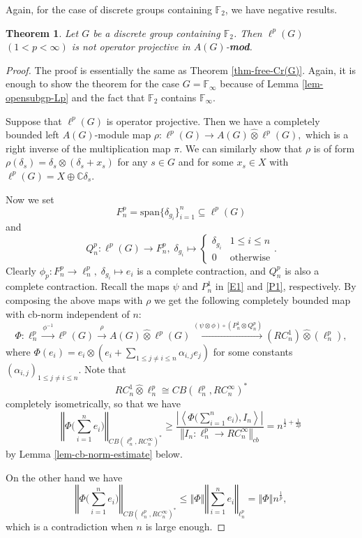 \documentclass[10pt]{amsart}
\newtheorem{thm}{Theorem}
\numberwithin{thm}{section}
\numberwithin{equation}{section}
\begin{document}
Again, for the case of discrete groups containing $\mathbb{F}_2$, we have negative results.
	\begin{thm}\label{thm-free-comLp}
	Let $G$ be a discrete group containing $\mathbb{F}_2$.
	Then $\ell^p(G)$ $(1<p < \infty)$ is not operator projective in $A(G)$-{\bf mod}.
	\end{thm}
\begin{proof}
The proof is essentially the same as Theorem \ref{thm-free-Cr(G)}.
Again, it is enough to show the theorem for the case $G = \mathbb{F}_\infty$
because of Lemma \ref{lem-opensubgp-Lp} and the fact that $\mathbb{F}_2$ contains $\mathbb{F}_\infty$.

Suppose that $\ell^p(G)$ is operator projective. Then we have a completely bounded left $A(G)$-module map
	$\rho : \ell^p(G) \rightarrow A(G) {\widehat{\otimes}} \ell^p(G),$
which is a right inverse of the multiplication map $\pi$. We can similarly show that $\rho$ is of form
$\rho(\delta_s) = \delta_s \otimes (\delta_s + x_s)$
for any $s\in G$ and for some $x_s \in X$ with $\ell^p(G)= X \oplus \mathbb{C}\delta_s$.

Now we set
	$$F^p_n = \text{span}\{\delta_{g_i}\}^n_{i=1} \subseteq \ell^p(G)$$
and
	$$Q^p_n : \ell^p(G) \rightarrow F^p_n,\; \delta_{g_i}\mapsto
	\left\{ \begin{array}{ll} \delta_{g_i} & 1\le i\le n\\ 0 & \text{otherwise} \end{array}\right..$$
Clearly $\phi_p : F^p_n \rightarrow \ell^p_n,\; \delta_{g_i} \mapsto e_i$ is a complete contraction,
and $Q^p_n$ is also a complete contraction. Recall the maps $\psi$ and $P^1_n$ in \eqref{E1} and \eqref{P1}, respectively.
By composing the above maps with $\rho$ we get the following completely bounded map with cb-norm independent of $n$: 
	$$\Phi : \ell^p_n \stackrel{\phi^{-1}}{\longrightarrow} \ell^p(G) \stackrel{\rho}{\longrightarrow} A(G) {\widehat{\otimes}} \ell^p(G)
	\stackrel{(\psi \otimes \phi)\circ (P^1_n\otimes Q^p_n)}{\longrightarrow} (RC^1_n) {\widehat{\otimes}} (\ell^p_n),$$
where $\Phi(e_i) = e_i \otimes (e_i + \sum_{1\le j\neq i\le n}\alpha_{i,j}e_j)$ for some constants $(\alpha_{i,j})_{1\le j\neq i\le n}$.
Note that
	$$RC^1_n {\widehat{\otimes}} \ell^p_n \cong CB(\ell^p_n, RC^\infty_n)^*$$
completely isometrically, so that we have
	$${\left\Vert{\Phi \Big(\sum^n_{i=1}e_i\Big)}\right\Vert}_{CB(\ell^p_n, RC^\infty_n)^*}
	\ge \frac{{\left\vert{\left\langle \Phi\Big(\sum^n_{i=1}e_i\Big), I_n \right\rangle}\right\vert}}{{\left\Vert{I_n : \ell^p_n \rightarrow RC^\infty_n}\right\Vert}_{cb}}
	= n^{\frac{1}{2} + \frac{1}{2p}}$$
by Lemma \ref{lem-cb-norm-estimate} below.

On the other hand we have
	$${\left\Vert{\Phi \Big(\sum^n_{i=1}e_i\Big)}\right\Vert}_{CB(\ell^p_n, RC^\infty_n)^*}
	\le {\left\Vert{\Phi}\right\Vert} {\left\Vert{\sum^n_{i=1}e_i}\right\Vert}_{\ell^p_n} = {\left\Vert{\Phi}\right\Vert}n^{\frac{1}{p}},$$
which is a contradiction when $n$ is large enough.

\end{proof}
\end{document}
